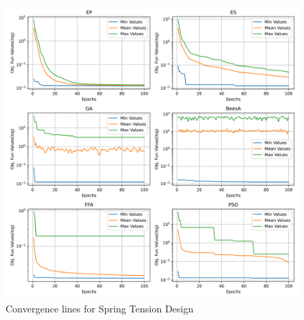 \begin{figure}[H]
\centering
\caption{Convergence lines for Spring Tension Design}
\label{fig:spring_problem_convergence}
\includegraphics[width=0.4 \textwidth]{images/spring_problem_convergence.png}
\end{figure}
    